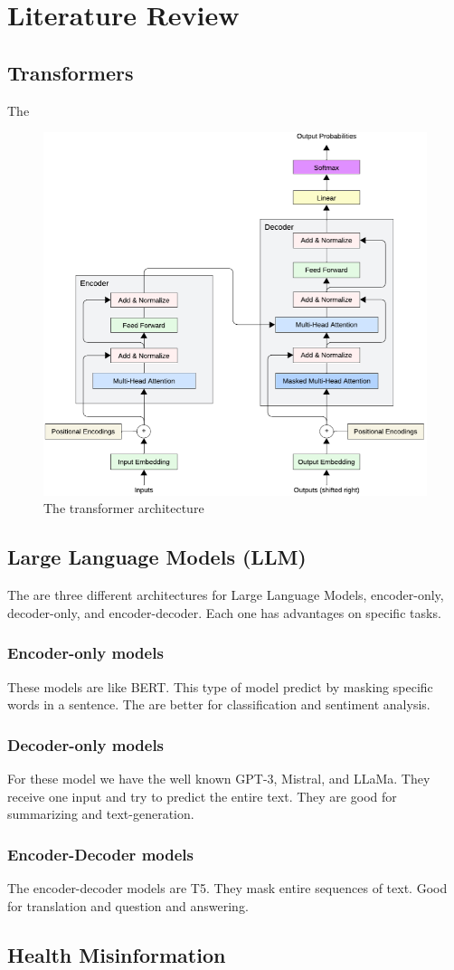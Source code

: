 \documentclass[chapters]{IEEEtran}
\begin{document}
\section{Literature Review}

\subsection{Transformers}
The 

\begin{figure}[!htb]
    \centering
        \includegraphics[width=0.75\linewidth]{figures/transformers_architecture.png}
        \caption{The transformer architecture}
\end{figure}

\subsection{Large Language Models (LLM)}

The are three different architectures for Large Language Models, encoder-only, decoder-only, and encoder-decoder. Each one has advantages on specific tasks.

\subsubsection{Encoder-only models}
These models are like BERT.
This type of model predict by masking specific words in a sentence.
The are better for classification and sentiment analysis.

\subsubsection{Decoder-only models}
For these model we have the well known GPT-3, Mistral, and LLaMa.
They receive one input and try to predict the entire text.
They are good for summarizing and text-generation.


\subsubsection{Encoder-Decoder models}
The encoder-decoder models are T5.
They mask entire sequences of text.
Good for translation and question and answering. \cite{9906925}

\subsection{Health Misinformation}

\printbibliography %
\end{document}
